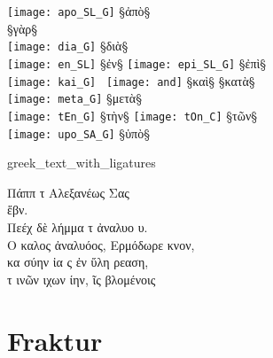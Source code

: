 \begin{liste}

\texttt{[image: apo\_SL\_G]} §{ἀπὸ}§ \\

 §{γὰρ}§ \\

 \texttt{[image: dia\_G]} §{διὰ}§ \\

\texttt{[image: en\_SL]} §{ἐν}§ \quad
\texttt{[image: epi\_SL\_G]} §{ἐπὶ}§ \\

 \texttt{[image: kai\_G]} \,
 \texttt{[image: and]} §{καὶ}§ \quad
{} §{κατὰ}§ \\

 \texttt{[image: meta\_G]} §{μετὰ}§ \\

\texttt{[image: tEn\_G]} §{τὴν}§ \quad
{} \texttt{[image: tOn\_C]} §{τῶν}§ \\

\texttt{[image: upo\_SA\_G]} §{ὑπὸ}§ \\

\end{liste}


\begin{sampleImage}{greek_text_with_ligatures}
\begin{typeGreek}
Πάππ τ Αλεξανέως Σας  \\
ἕβν. \\
Πεέχ δὲ λήμμα τ ἀναλυο υ. \\
Ο καλος ἀναλυόος, Ερμόδωρε κνον,  \\
κα σύην ἰα ς ἐν ὕλη ρεαση,  \\
 τ  ινῶν ιχων ίην, ῖς βλομένοις  \\
\someText {}
\end{typeGreek}
\end{sampleImage}


\section{Fraktur}
\label{section fraktur}

